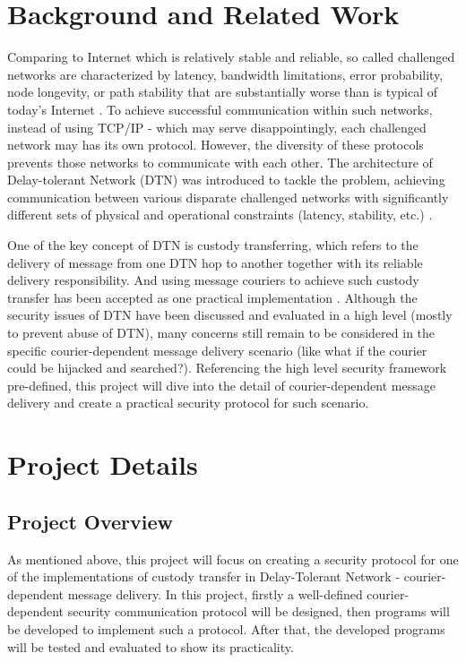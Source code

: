 \documentclass[11pt,a4paper]{article}
\begin{document}
\section{Background and Related Work}
Comparing to Internet which is relatively stable and reliable, so called challenged networks are characterized by latency, bandwidth limitations, error probability, node longevity, or path stability that are substantially worse than is typical of today's Internet \cite{fall}. To achieve successful communication within such networks, instead of using TCP/IP - which may serve disappointingly, each challenged network may has its own protocol. However, the diversity of these protocols prevents those networks to communicate with each other. The architecture of Delay-tolerant Network (DTN) was introduced to tackle the problem, achieving communication between various disparate challenged networks with significantly different sets of physical and operational constraints (latency, stability, etc.) \cite{burleigh} \cite{fall}. \par 
One of the key concept of DTN is custody transferring, which refers to the delivery of message from one DTN hop to another together with its reliable delivery responsibility. And using message couriers to achieve such custody transfer has been accepted as one practical implementation \cite{zhao}. Although the security issues of DTN have been discussed and evaluated in a high level \cite{cerf} \cite{symington} (mostly to prevent abuse of DTN), many concerns still remain to be considered in the specific courier-dependent message delivery scenario (like what if the courier could be hijacked and searched?). Referencing the high level security framework pre-defined, this project will dive into the detail of courier-dependent message delivery and create a practical security protocol for such scenario.



\section{Project Details}
\subsection{Project Overview}
As mentioned above, this project will focus on creating a security protocol for one of the implementations of custody transfer in Delay-Tolerant Network - courier-dependent message delivery. In this project, firstly a well-defined courier-dependent security communication protocol will be designed, then programs will be developed to implement such a protocol. After that, the developed programs will be tested and evaluated to show its practicality.
\end{document}
